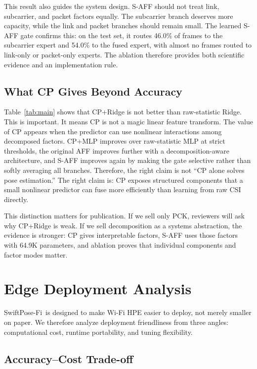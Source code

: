 \documentclass[10pt,conference]{IEEEtran}
\newcommand{\method}{SwiftPose-Fi}
\begin{document}
This result also guides the system design. S-AFF should not treat link, subcarrier, and packet factors equally. The subcarrier branch deserves more capacity, while the link and packet branches should remain small. The learned S-AFF gate confirms this: on the test set, it routes 46.0\% of frames to the subcarrier expert and 54.0\% to the fused expert, with almost no frames routed to link-only or packet-only experts. The ablation therefore provides both scientific evidence and an implementation rule.

\subsection{What CP Gives Beyond Accuracy}

Table~\ref{tab:main} shows that CP+Ridge is not better than raw-statistic Ridge. This is important. It means CP is not a magic linear feature transform. The value of CP appears when the predictor can use nonlinear interactions among decomposed factors. CP+MLP improves over raw-statistic MLP at strict thresholds, the original AFF improves further with a decomposition-aware architecture, and S-AFF improves again by making the gate selective rather than softly averaging all branches. Therefore, the right claim is not ``CP alone solves pose estimation.'' The right claim is: CP exposes structured components that a small nonlinear predictor can fuse more efficiently than learning from raw CSI directly.

This distinction matters for publication. If we sell only PCK, reviewers will ask why CP+Ridge is weak. If we sell decomposition as a systems abstraction, the evidence is stronger: CP gives interpretable factors, S-AFF uses those factors with 64.9K parameters, and ablation proves that individual components and factor modes matter.

\section{Edge Deployment Analysis}

\method\ is designed to make Wi-Fi HPE easier to deploy, not merely smaller on paper. We therefore analyze deployment friendliness from three angles: computational cost, runtime portability, and tuning flexibility.

\subsection{Accuracy--Cost Trade-off}
\end{document}
